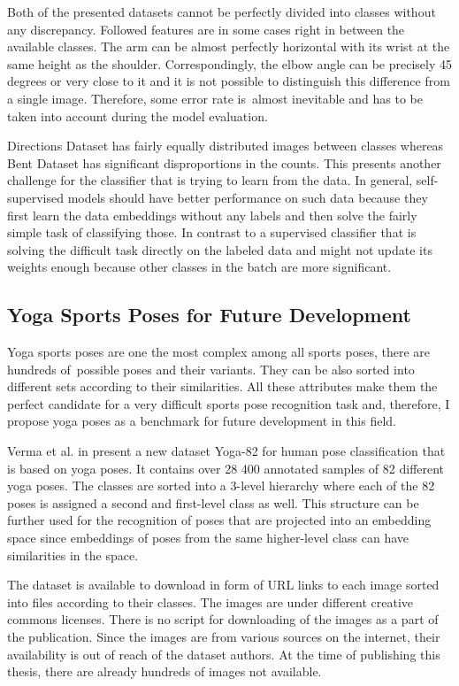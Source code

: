 Both of the presented datasets cannot be perfectly divided into classes without any discrepancy. Followed features are in some cases right in between the available classes. The arm can be almost perfectly horizontal with its wrist at the same height as the shoulder. Correspondingly, the elbow angle can be precisely 45 degrees or very close to it and it is not possible to distinguish this difference from a single image. Therefore, some error rate is~almost inevitable and has to be taken into account during the model evaluation.

Directions Dataset has fairly equally distributed images between classes whereas Bent Dataset has significant disproportions in the counts. This presents another challenge for the classifier that is trying to learn from the data. In general, self-supervised models should have better performance on such data because they first learn the data embeddings without any labels and then solve the fairly simple task of classifying those. In contrast to a supervised classifier that is solving the difficult task directly on the labeled data and might not update its weights enough because other classes in the batch are more significant.

\subsection{Yoga Sports Poses for Future Development}

Yoga sports poses are one the most complex among all sports poses, there are hundreds of~possible poses and their variants. They can be also sorted into different sets according to their similarities. All these attributes make them the perfect candidate for a very difficult sports pose recognition task and, therefore, I propose yoga poses as a benchmark for future development in this field.

Verma et al. in \cite{verma2020yoga} present a new dataset Yoga-82 for human pose classification that is based on yoga poses. It contains over 28 400 annotated samples of 82 different yoga poses. The classes are sorted into a 3-level hierarchy where each of the 82 poses is assigned a second and first-level class as well. This structure can be further used for the recognition of poses that are projected into an embedding space since embeddings of poses from the same higher-level class can have similarities in the space.

The dataset is available to download in form of URL links to each image sorted into files according to their classes. The images are under different creative commons licenses. There is no script for downloading of the images as a part of the publication. Since the images are from various sources on the internet, their availability is out of reach of the dataset authors. At the time of publishing this thesis, there are already hundreds of images not available.

